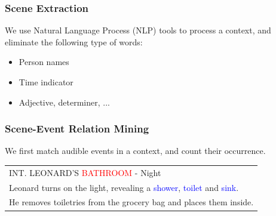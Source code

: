 \documentclass[xcolor=table,slidestop,compress,mathserif]{beamer}
\begin{document}
\begin{frame}
	\frametitle{Scene Extraction}
	We use Natural Language Process (NLP) tools to process a context, and eliminate the following type of words: \\ 
	\begin{itemize}
		\item{Person names} 
		\item{Time indicator}
		\item{Adjective, determiner, ...}
	\end{itemize}
	\pause 
	
	\begin{table}[htb]
	\centering
	\caption{Top 10 Occurred Scenes}
	\end{table}
\end{frame}
\begin{frame}
	\frametitle{Scene-Event Relation Mining}
	We first match audible events in a context, and count their occurrence. 
	\begin{table}[h]
		\begin{tabular}{|l|}
		\hline
		INT. LEONARD'S \textcolor{red}{BATHROOM} - Night \\ 
		Leonard turns on the light, revealing a \textcolor{blue}{shower}, \textcolor{blue}{toilet} and \textcolor{blue}{sink}.\\
		He removes toiletries from the grocery bag and places them inside. \\ 
		\hline
		\end{tabular}
	\end{table}
\end{frame}
\end{document}
